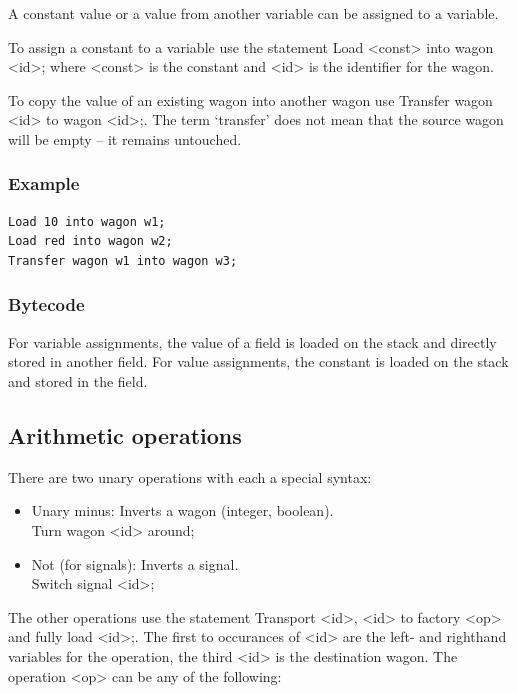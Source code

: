 \documentclass[10pt,a4paper]{article}
\newcommand{\code}[1]{{\ttfamily\small #1}}
\begin{document}
A constant value or a value from another variable can be assigned to a variable.

To assign a constant to a variable use the statement \code{Load <const> into wagon <id>;} where \code{<const>} is the constant and \code{<id>} is the identifier for the wagon.

To copy the value of an existing wagon into another wagon use \code{Transfer wagon <id> to wagon <id>;}. The term `transfer' does not mean that the source wagon will be empty -- it remains untouched.

\subsubsection*{Example}

\begin{lstlisting}
Load 10 into wagon w1;
Load red into wagon w2;
Transfer wagon w1 into wagon w3;
\end{lstlisting}

\subsubsection*{Bytecode}

For variable assignments, the value of a field is loaded on the stack and directly stored in another field. For value assignments, the constant is loaded on the stack and stored in the field.

\subsection{Arithmetic operations}

There are two unary operations with each a special syntax:

\begin{itemize}
\item Unary minus: Inverts a wagon (integer, boolean). \\ \code{Turn wagon <id> around;}
\item Not (for signals): Inverts a signal. \\ \code{Switch signal <id>;}
\end{itemize}

The other operations use the statement \code{Transport <id>, <id> to factory <op> and fully load <id>;}. The first to occurances of \code{<id>} are the left- and righthand variables for the operation, the third \code{<id>} is the destination wagon. The operation \code{<op>} can be any of the following:
\end{document}
